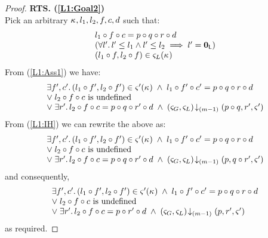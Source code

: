 \begin{lemma}
\begin{proof}
\noindent\textbf{RTS. (\ref{L1:Goal2})}\\
Pick an arbitrary $\kappa_{}, l_1, l_2, f, c, d$ such that:
%
\begin{align}
	\begin{array}{l}
		l_1 \circ f \circ c = p \circ q \circ r \circ d\\
		\left(\forall l'.\, l' \leq l_1 \land l' \leq l_2 \implies l' = \mathbf{0}_{\textsf{L}}\right)\\
  	(l_1 \circ f, l_2 \circ f) \in \varsigma_{L}(\kappa_{}) \\
	\end{array} \label{LCS: Ass1}
\end{align} 
%
From (\ref{L1:Ass1}) we have:
%
\[
\begin{array}{l}
	\exists f', c'.\, (l_1 \circ f', l_2 \circ f') \in \varsigma_{}'(\kappa_{}) \;\land\; l_1 \circ f' \circ c' =  p \circ q \circ r \circ d\\
	\lor\;l_2 \circ f \circ c \text{ is undefined}\\
	\lor\; \exists r'.\, l_2 \circ f \circ c = p \circ q \circ r' \circ d \;\land\;\left(\varsigma_{G}, \varsigma_{L}\right) \!\downarrow_{(m-1)} \left(p \circ q, r', \varsigma_{}'\right)
\end{array}
\]
%
From (\ref{L1:IH}) we can rewrite the above as: 
%
\[
\begin{array}{l}
	\exists f', c'.\, (l_1 \circ f', l_2 \circ f') \in \varsigma_{}'(\kappa_{}) \;\land\; l_1 \circ f' \circ c' =  p \circ q \circ r \circ d\\
	\lor\;l_2 \circ f \circ c \text{ is undefined}\\
	\lor\; \exists r'.\, l_2 \circ f \circ c = p \circ q \circ r' \circ d \;\land\; \left(\varsigma_{G}, \varsigma_{L}\right) \!\downarrow_{(m-1)} \left(p, q \circ r', \varsigma_{}'\right)
\end{array}
\]
%
and consequently,
%
\[
\begin{array}{l}
	\exists f', c'.\, (l_1 \circ f', l_2 \circ f') \in \varsigma_{}'(\kappa_{}) \;\land\; l_1 \circ f' \circ c' =  p \circ q \circ r \circ d\\
	\lor\;l_2 \circ f \circ c \text{ is undefined}\\
	\lor\; \exists r'.\, l_2 \circ f \circ c = p \circ r' \circ d \;\land\; \left(\varsigma_{G}, \varsigma_{L}\right) \!\downarrow_{(m-1)} \left(p, r', \varsigma_{}'\right)
\end{array}
\]
%
as required.
\end{proof}
\end{lemma}
